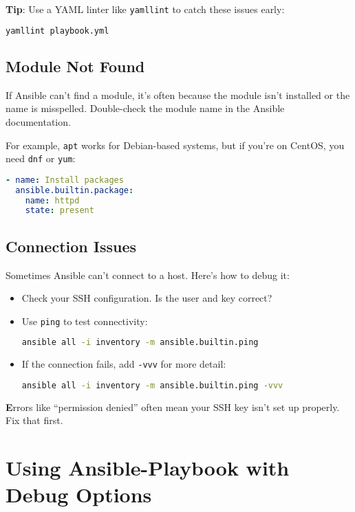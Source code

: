 \textbf{Tip}: Use a YAML linter like \texttt{yamllint} to catch these issues early:
\begin{lstlisting}[language=bash, caption=Using yamllint]
yamllint playbook.yml
\end{lstlisting}

\subsection{Module Not Found}

If Ansible can't find a module, it's often because the module isn't installed or the name is misspelled. Double-check the module name in the Ansible documentation.

For example, \texttt{apt} works for Debian-based systems, but if you're on CentOS, you need \texttt{dnf} or \texttt{yum}:
\begin{lstlisting}[language=yaml, caption=Correct Module for CentOS]
- name: Install packages
  ansible.builtin.package:
    name: httpd
    state: present
\end{lstlisting}

\subsection{Connection Issues}

Sometimes Ansible can't connect to a host. Here's how to debug it:
\begin{itemize}
    \item Check your SSH configuration. Is the user and key correct?
    \item Use \texttt{ping} to test connectivity:
    \begin{lstlisting}[language=bash, caption=Testing Connectivity]
ansible all -i inventory -m ansible.builtin.ping
    \end{lstlisting}
    \item If the connection fails, add \texttt{-vvv} for more detail:
    \begin{lstlisting}[language=bash, caption=Verbose Output]
ansible all -i inventory -m ansible.builtin.ping -vvv
    \end{lstlisting}
\end{itemize}

\textbf{E}rrors like “permission denied” often mean your SSH key isn't set up properly. Fix that first.


\section{Using Ansible-Playbook with Debug Options}

